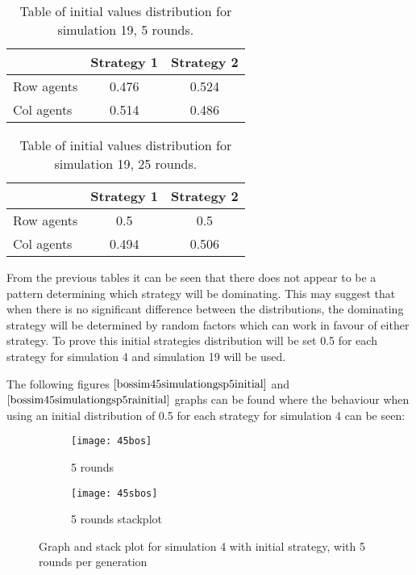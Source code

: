 \begin{table}[H]
\begin{center}
\begin{tabular}{|l|c|c|}
\hline
 & Strategy 1 & Strategy 2\\ 
\hline
Row agents & 0.476 & 0.524 \\
\hline
Col agents & 0.514 & 0.486\\
\hline
\end{tabular}
\caption{ Table of initial values distribution for simulation 19, 5 rounds.}
\label{tab:bossim19r5}	
\end{center}
\end{table}

\begin{table}[H]
\begin{center}
\begin{tabular}{|l|c|c|}
\hline
 & Strategy 1 & Strategy 2\\ 
\hline
Row agents &  0.5 & 0.5\\
\hline
Col agents &  0.494 & 0.506\\
\hline
\end{tabular}
\caption{ Table of initial values distribution for simulation 19, 25 rounds.}
\label{tab:bossim19r25}	
\end{center}
\end{table}

From the previous tables it can be seen that there does not appear to be a pattern determining which strategy will be dominating. This may suggest that when there is no significant difference between the distributions, the dominating strategy will be determined by random factors which can work in favour of either strategy. To prove this initial strategies distribution will be set 0.5 for each strategy for simulation 4 and simulation 19 will be used.

The following figures $\ref{bossim45simulationgsp5initial}$ and $\ref{bossim45simulationgsp5rainitial}$ graphs can be found where the behaviour when using an initial distribution of 0.5 for each strategy for simulation 4 can be seen:

\begin{figure}[H]       
    \centering
    \begin{subfigure}[b]{0.3\textwidth}
	\centering
	{\texttt{[image: 45bos]}}   
    	\caption{5 rounds}
	\label{fig:bossim45bos}
    \end{subfigure}
    \hfill
    \begin{subfigure}[b]{0.3\textwidth}
	\centering
	{\texttt{[image: 45sbos]}}   
    	\caption{5 rounds stackplot}
	\label{fig:bossim45sbos}
    \end{subfigure}
    \caption{Graph and stack plot for simulation 4 with initial strategy, with 5 rounds per generation}
    \label{bossim45simulationgsp5initial}
\end{figure}

